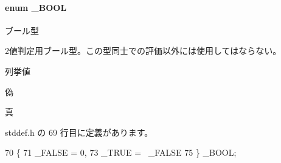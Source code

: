 \paragraph[{\+\_\+\+B\+O\+O\+L}]{\setlength{\rightskip}{0pt plus 5cm}enum {\bf \+\_\+\+B\+O\+O\+L}}\label{stddef_8h_afbf708854fe02af8475a9ba02f3196cb_afbf708854fe02af8475a9ba02f3196cb}


ブール型 

2値判定用ブール型。この型同士での評価以外には使用してはならない。 \begin{Desc}
\item[列挙値]\par
\begin{description}
\item[{\em 
\+\_\+\+F\+A\+L\+S\+E\label{stddef_8h_afbf708854fe02af8475a9ba02f3196cb_afbf708854fe02af8475a9ba02f3196cbae1655d02c01959d1d8c86857c44ea40d}
}]偽 \item[{\em 
\+\_\+\+T\+R\+U\+E\label{stddef_8h_afbf708854fe02af8475a9ba02f3196cb_afbf708854fe02af8475a9ba02f3196cbae784f36ee3de121254ae0ce38716c51d}
}]真 \end{description}
\end{Desc}


 stddef.\+h の 69 行目に定義があります。


\begin{DoxyCode}
70 \{
71     _FALSE = 0,
73     _TRUE = ~_FALSE
75 \} _BOOL;
\end{DoxyCode}
